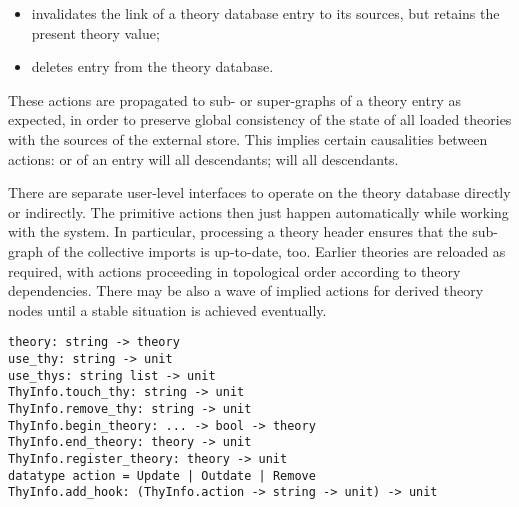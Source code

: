 \begin{isabellebody}
\begin{isamarkuptext}
\begin{itemize}
  \item {} invalidates the link of a theory database
  entry to its sources, but retains the present theory value;

  \item {} deletes entry  from the theory
  database.
  
  \end{itemize}

  These actions are propagated to sub- or super-graphs of a theory
  entry as expected, in order to preserve global consistency of the
  state of all loaded theories with the sources of the external store.
  This implies certain causalities between actions: 
  or  of an entry will  all
  descendants;  will  all descendants.

  \medskip There are separate user-level interfaces to operate on the
  theory database directly or indirectly.  The primitive actions then
  just happen automatically while working with the system.  In
  particular, processing a theory header  ensures that the
  sub-graph of the collective imports 
  is up-to-date, too.  Earlier theories are reloaded as required, with
   actions proceeding in topological order according to
  theory dependencies.  There may be also a wave of implied  actions for derived theory nodes until a stable situation
  is achieved eventually.%
\end{isamarkuptext}%
\isamarkuptrue%
%
\isadelimmlref
%
\endisadelimmlref
%
\isatagmlref
%
\begin{isamarkuptext}%
\begin{mldecls}
  \verb|theory: string -> theory| \\
  \verb|use_thy: string -> unit| \\
  \verb|use_thys: string list -> unit| \\
  \verb|ThyInfo.touch_thy: string -> unit| \\
  \verb|ThyInfo.remove_thy: string -> unit| \\[1ex]
  \verb|ThyInfo.begin_theory|\verb|: ... -> bool -> theory| \\
  \verb|ThyInfo.end_theory: theory -> unit| \\
  \verb|ThyInfo.register_theory: theory -> unit| \\[1ex]
  \verb|datatype action = Update |\verb,|,\verb| Outdate |\verb,|,\verb| Remove| \\
  \verb|ThyInfo.add_hook: (ThyInfo.action -> string -> unit) -> unit| \\
  \end{mldecls}


\end{isamarkuptext}
\end{isabellebody}
